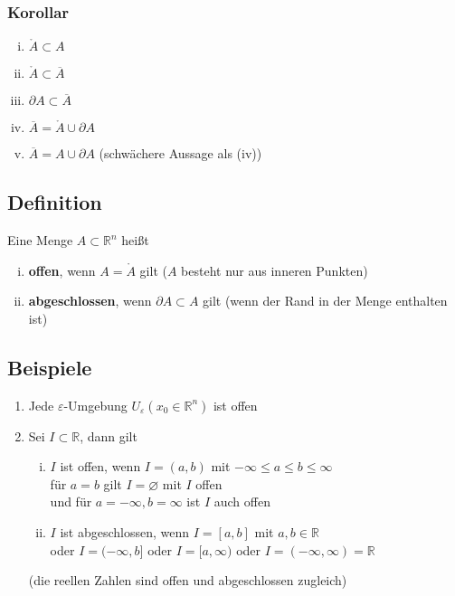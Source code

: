 \documentclass[11pt,a4paper]{book}
\newcommand {\R}	{\mathbb{R}}
\newcommand {\Rn}	{\mathbb{R}^n}
\newcommand{\1}    	{\mathbbm{1}}
\begin{document}
\subsubsection*{Korollar}
\begin{enumerate}[(i)]
	\item \(\mathring{A} \subset A\)
	\item \(\mathring{A} \subset \overline{A}\)
	\item \(\partial A \subset \overline{A}\)
	\item \(\overline{A} = \mathring{A} \cup \partial A \)
	\item \(\overline{A} = A \cup \partial A \) (schwächere Aussage als (iv))
\end{enumerate}

\subsection{Definition}
Eine Menge \(A \subset \Rn\) heißt
\begin{enumerate}[(i)]
	\item \textbf{offen}, wenn \(A = \mathring{A} \) gilt (\(A\) besteht nur aus inneren Punkten)
	\item \textbf{abgeschlossen}, wenn \(\partial A \subset A \) gilt (wenn der Rand in der Menge enthalten ist)
\end{enumerate}

\subsection{Beispiele}
\begin{enumerate}[1.~]
	\item Jede \(\varepsilon\)-Umgebung \(U_\varepsilon(x_0 \in \Rn)\) ist offen
	\item Sei \(I \subset \R\), dann gilt
	\begin{enumerate}[(i)]
		\item \(I\) ist offen, wenn \(I = (a,b)\) mit \( -\infty \leqslant a \leqslant b \leqslant \infty \) \\
		für \(a = b\) gilt \(I = \varnothing\) mit \(I\) offen \\
		und für \(a = -\infty, b = \infty\) ist \(I\) auch offen
		\item \(I\) ist abgeschlossen, wenn \(I = [a,b]\) mit \(a,b \in \R\) \\
		oder \(I = (-\infty, b]\) oder \(I = [a, \infty) \) oder \(I = (-\infty, \infty) = \R\)
	\end{enumerate}
	(die reellen Zahlen sind offen und abgeschlossen zugleich)
\end{enumerate}
\end{document}
